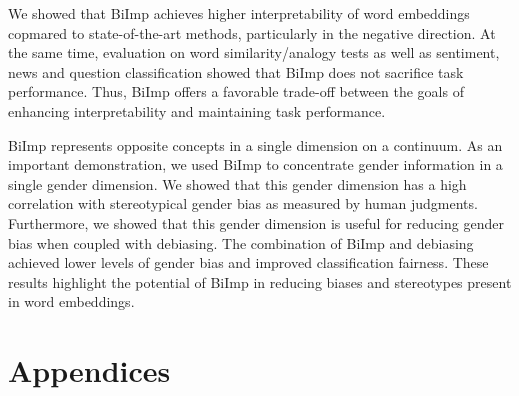 \documentclass[11pt,a4paper]{article}
\def\proposedmethod{BiImp}
\begin{document}
We showed that  \proposedmethod{}
achieves higher interpretability of word embeddings copmared to
state-of-the-art methods, particularly in the negative
direction. At the same time, evaluation on word
similarity/analogy tests as well as sentiment, news and
question classification  showed that \proposedmethod{} does
not sacrifice task performance.
Thus, \proposedmethod{} offers a favorable
trade-off between the goals of enhancing
interpretability and maintaining task performance.




\proposedmethod{} represents opposite concepts in a single
dimension on a continuum. As an important demonstration, we
used \proposedmethod{} to concentrate gender information in
a single gender dimension.  We showed that this gender
dimension has a high correlation with stereotypical gender
bias as measured by human judgments. Furthermore, we showed
that this gender dimension is useful for reducing gender
bias when coupled with debiasing.  The combination of
\proposedmethod{} and debiasing achieved lower levels of
gender bias and improved classification fairness. These
results highlight the potential of \proposedmethod{} in
reducing biases and stereotypes present in word embeddings.






\clearpage

\appendix

\section{Appendices}
\end{document}
